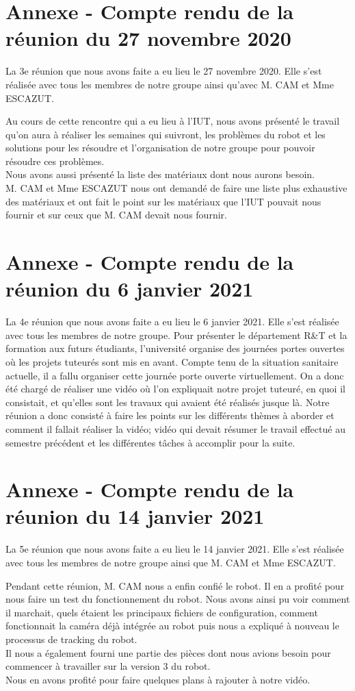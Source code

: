 \documentclass{PackagerQualityN}
\begin{document}
\section*{Annexe - Compte rendu de la réunion du 27 novembre 2020}
La 3e réunion que nous avons faite a eu lieu le 27 novembre 2020. Elle s'est réalisée avec tous les membres de notre groupe ainsi qu'avec M. CAM et Mme ESCAZUT.

Au cours de cette rencontre qui a eu lieu à l'IUT, nous avons présenté le travail qu'on aura à réaliser les semaines qui suivront, les problèmes du robot et les solutions pour les résoudre et l'organisation de notre groupe pour pouvoir résoudre ces problèmes.
\\
Nous avons aussi présenté la liste des matériaux dont nous aurons besoin.
\\
M. CAM et Mme ESCAZUT nous ont demandé de faire une liste plus exhaustive des matériaux et ont fait le point sur les matériaux que l'IUT pouvait nous fournir et sur ceux que M. CAM devait nous fournir.


\newp
\section*{Annexe - Compte rendu de la réunion du 6 janvier 2021}
La 4e réunion que nous avons faite a eu lieu le 6 janvier 2021. Elle s'est réalisée avec tous les membres de notre groupe.
Pour présenter le département R\&T et la formation aux futurs étudiants, l'université organise des journées portes ouvertes où les projets tuteurés sont mis en avant. Compte tenu de la situation sanitaire actuelle, il a fallu organiser cette journée porte ouverte virtuellement.
On a donc été chargé de réaliser une vidéo où l'on expliquait notre projet tuteuré, en quoi il consistait, et qu'elles sont les travaux qui avaient été réalisés jusque là.
Notre réunion a donc consisté à faire les points sur les différents thèmes à aborder et comment il fallait réaliser la vidéo; vidéo qui devait résumer le travail effectué au semestre précédent et  les différentes tâches à accomplir pour la suite.
\newp
\section*{Annexe - Compte rendu de la réunion du 14 janvier 2021}
La 5e réunion que nous avons faite a eu lieu le 14 janvier 2021. Elle s'est réalisée avec tous les membres de notre groupe ainsi que M. CAM et Mme ESCAZUT.

Pendant cette réunion, M. CAM nous a enfin confié le robot. Il en a profité pour nous faire un test du fonctionnement du robot. Nous avons ainsi pu voir comment il marchait, quels étaient les principaux fichiers de configuration, comment fonctionnait la caméra déjà intégrée au robot puis nous a expliqué à nouveau le processus de tracking du robot.
\\
Il nous a également fourni une partie des pièces dont nous avions besoin pour commencer à travailler sur la version 3 du robot.
\\
Nous en avons profité pour faire quelques plans à rajouter à notre vidéo.
\end{document}
